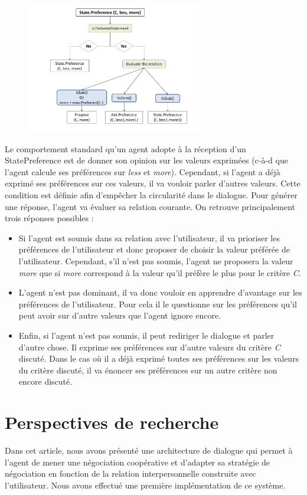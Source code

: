 \documentclass [french]{sig-alternate-05-2015}
\begin{document}
 \begin{figure} [h]
 	\centerline{\includegraphics[width=3in]{figs/statePref.pdf}}
	\vskip 8pt
 \end{figure}


Le comportement standard qu'un agent adopte à la réception d'un StatePreference est de donner son opinion sur les valeurs exprimées (c-à-d que l'agent calcule ses préférences sur \textit{less} et \textit{more}). Cependant, si l'agent a déjà exprimé ses préférences sur ces valeurs, il va vouloir parler d'autres valeurs. Cette condition est définie afin d'empêcher la circularité dans le dialogue.  
Pour générer une réponse, l'agent va évaluer sa relation courante. On retrouve principalement trois réponses possibles : 
 \begin{itemize}
 	\item Si l'agent est soumis dans sa relation avec l'utilisateur, il va prioriser les préférences de l'utilisateur et donc proposer de choisir la valeur préférée de l'utilisateur. Cependant, s'il n'est pas soumis, l'agent ne proposera la valeur \textit{more} que si \textit{more} correspond à la valeur qu'il préfère le plus pour le critère \emph{C}. 
 	\item L'agent n'est pas dominant, il va donc vouloir en apprendre d'avantage sur  les préférences de l'utilisateur. Pour cela il le questionne sur les préférences qu'il peut avoir sur  d'autre valeurs que l'agent ignore encore.
 	\item Enfin, si l'agent n'est pas soumis, il peut rediriger le dialogue et parler d'autre chose. Il exprime ses préférences sur d'autre valeurs du critère \emph{C} discuté. Dans le cas où il a déjà exprimé toutes ses préférences sur les valeurs du critère discuté, il va énoncer ses préférences sur un autre critère non encore discuté.
 \end{itemize}
\section{Perspectives de recherche}
\label{conc}
Dans cet article, nous avons présenté une architecture de dialogue qui permet à l'agent de mener une négociation coopérative et d'adapter sa stratégie de négociation en fonction de la relation interpersonnelle construite avec l'utilisateur. Nous avons effectué une première implémentation de ce système. 
\end{document}
